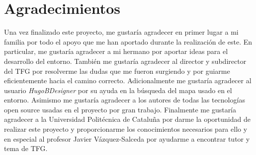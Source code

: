 \section{Agradecimientos}

Una vez finalizado este proyecto, me gustaría agradecer en primer lugar a mi familia por todo el apoyo que me han aportado durante la realización de este. En particular, me gustaría agradecer a mi hermano por aportar ideas para el desarrollo del entorno. También me gustaría agradecer al director y subdirector del TFG por resolverme las dudas que me fueron surgiendo y por guiarme eficientemente hacia el camino correcto. Adicionalmente me gustaría agradecer al usuario \textit{HugoBDesigner} por su ayuda en la búsqueda del mapa usado en el entorno. Asimismo me gustaría agradecer a los autores de todas las tecnologías open source usadas en el proyecto por gran trabajo. Finalmente me gustaría agradecer a la Universidad Politécnica de Cataluña por darme la oportunidad de realizar este proyecto y proporcionarme los conocimientos necesarios para ello y en especial al profesor Javier Vázquez-Salceda por ayudarme a encontrar tutor y tema de TFG.
